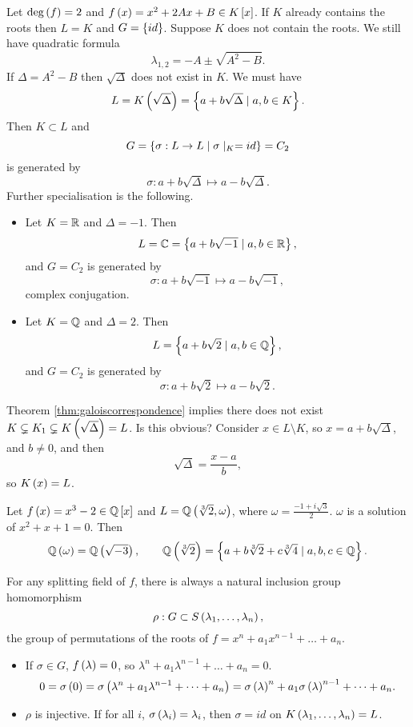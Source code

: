 \begin{example1}
Let $ \deg\left( f \right) = 2 $ and $ f\left( x \right) = x^2 + 2Ax + B \in K\left[ x \right] $. If $ K $ already contains the roots then $ L = K $ and $ G = \left\{ id \right\} $. Suppose $ K $ does not contain the roots. We still have quadratic formula
$$ \lambda_{1, 2} = -A \pm \sqrt{A^2 - B}. $$
If $ \Delta = A^2 - B $ then $ \sqrt{\Delta} $ does not exist in $ K $. We must have
$$ L = K\left( \sqrt{\Delta} \right) = \left\{ a + b\sqrt{\Delta} \mid a, b \in K \right\}. $$
Then $ K \subset L $ and
$$ G = \left\{ \sigma : L \to L \mid \sigma \mid_K = id \right\} = C_2 $$
is generated by
$$ \sigma : a + b\sqrt{\Delta} \mapsto a - b\sqrt{\Delta}. $$
Further specialisation is the following.
\begin{itemize}
\item Let $ K = \mathbb{R} $ and $ \Delta = -1 $. Then
$$ L = \mathbb{C} = \left\{ a + b\sqrt{-1} \mid a, b \in \mathbb{R} \right\}, $$
and $ G = C_2 $ is generated by
$$ \sigma : a + b\sqrt{-1} \mapsto a - b\sqrt{-1}, $$
complex conjugation.
\item Let $ K = \mathbb{Q} $ and $ \Delta = 2 $. Then
$$ L = \left\{ a + b\sqrt{2} \mid a, b \in \mathbb{Q} \right\}, $$
and $ G = C_2 $ is generated by
$$ \sigma : a + b\sqrt{2} \mapsto a - b\sqrt{2}. $$
\end{itemize}
Theorem \ref{thm:galoiscorrespondence} implies there does not exist $ K \subsetneq K_1 \subsetneq K\left( \sqrt{\Delta} \right) = L $. Is this obvious? Consider $ x \in L \setminus K $, so $ x = a + b\sqrt{\Delta} $, and $ b \ne 0 $, and then
$$ \sqrt{\Delta} = \dfrac{x - a}{b}, $$
so $ K\left( x \right) = L $.
\end{example1}

\begin{example1}
Let $ f\left( x \right) = x^3 - 2 \in \mathbb{Q}\left[ x \right] $ and $ L = \mathbb{Q}\left( \sqrt[3]{2}, \omega \right) $, where $ \omega = \tfrac{-1 + i\sqrt{3}}{2} $. $ \omega $ is a solution of $ x^2 + x + 1 = 0 $. Then
$$ \mathbb{Q}\left( \omega \right) = \mathbb{Q}\left( \sqrt{-3} \right), \qquad \mathbb{Q}\left( \sqrt[3]{2} \right) = \left\{ a + b\sqrt[3]{2} + c\sqrt[3]{4} \mid a, b, c \in \mathbb{Q} \right\}. $$
\end{example1}

\begin{remark1}
\label{rem:inclusionhomomorphism}
For any splitting field of $ f $, there is always a natural inclusion group homomorphism
$$ \rho : G \subset S\left( \lambda_1, \dots, \lambda_n \right), $$
the group of permutations of the roots of $ f = x^n + a_1x^{n - 1} + \dots + a_n $.
\begin{itemize}
\item If $ \sigma \in G $, $ f\left( \lambda \right) = 0 $, so $ \lambda^n + a_1\lambda^{n - 1} + \dots + a_n = 0 $.
$$ 0 = \sigma\left( 0 \right) = \sigma\left( \lambda^n + a_1\lambda^{n - 1} + \dots + a_n \right) = \sigma\left( \lambda \right)^n + a_1\sigma\left( \lambda \right)^{n - 1} + \dots + a_n. $$
\item $ \rho $ is injective. If for all $ i $, $ \sigma\left( \lambda_i \right) = \lambda_i $, then $ \sigma = id $ on $ K\left( \lambda_1, \dots, \lambda_n \right) = L $.
\end{itemize}
\end{remark1}

